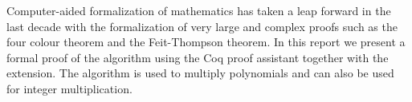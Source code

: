 Computer-aided formalization of mathematics has taken a leap forward in the
last decade with the formalization of very large and complex proofs such as the
four colour theorem and the Feit-Thompson theorem. In this report we present a
formal proof of the \toom algorithm using the Coq proof assistant together with
the \ssr extension. The \toom algorithm is used to multiply polynomials and can
also be used for integer multiplication.
